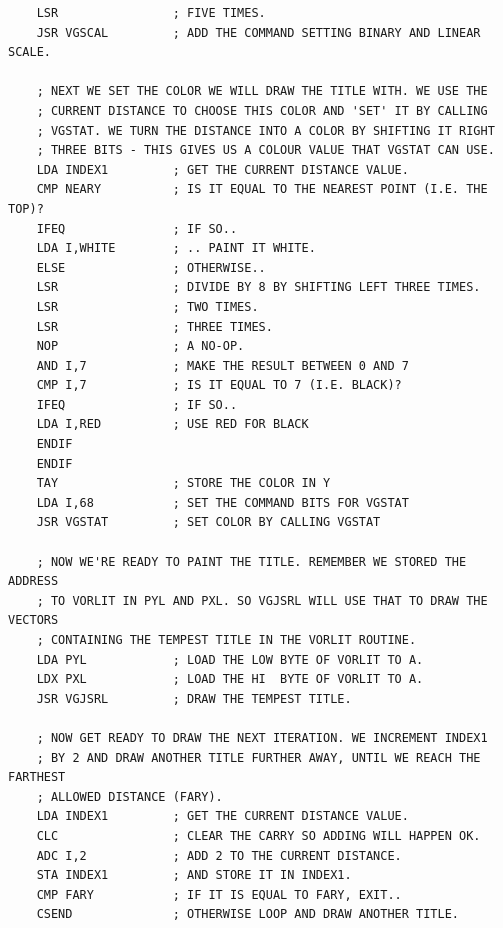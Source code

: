 \begin{lstlisting}
    LSR                ; FIVE TIMES.
    JSR VGSCAL         ; ADD THE COMMAND SETTING BINARY AND LINEAR SCALE.
    
    ; NEXT WE SET THE COLOR WE WILL DRAW THE TITLE WITH. WE USE THE
    ; CURRENT DISTANCE TO CHOOSE THIS COLOR AND 'SET' IT BY CALLING
    ; VGSTAT. WE TURN THE DISTANCE INTO A COLOR BY SHIFTING IT RIGHT
    ; THREE BITS - THIS GIVES US A COLOUR VALUE THAT VGSTAT CAN USE.
    LDA INDEX1         ; GET THE CURRENT DISTANCE VALUE.
    CMP NEARY          ; IS IT EQUAL TO THE NEAREST POINT (I.E. THE TOP)?
    IFEQ               ; IF SO..
    LDA I,WHITE        ; .. PAINT IT WHITE.
    ELSE               ; OTHERWISE..
    LSR                ; DIVIDE BY 8 BY SHIFTING LEFT THREE TIMES.
    LSR                ; TWO TIMES.
    LSR                ; THREE TIMES.
    NOP                ; A NO-OP.
    AND I,7            ; MAKE THE RESULT BETWEEN 0 AND 7
    CMP I,7            ; IS IT EQUAL TO 7 (I.E. BLACK)?
    IFEQ               ; IF SO..
    LDA I,RED          ; USE RED FOR BLACK
    ENDIF
    ENDIF
    TAY                ; STORE THE COLOR IN Y
    LDA I,68           ; SET THE COMMAND BITS FOR VGSTAT
    JSR VGSTAT         ; SET COLOR BY CALLING VGSTAT
    
    ; NOW WE'RE READY TO PAINT THE TITLE. REMEMBER WE STORED THE ADDRESS
    ; TO VORLIT IN PYL AND PXL. SO VGJSRL WILL USE THAT TO DRAW THE VECTORS
    ; CONTAINING THE TEMPEST TITLE IN THE VORLIT ROUTINE.
    LDA PYL            ; LOAD THE LOW BYTE OF VORLIT TO A.
    LDX PXL            ; LOAD THE HI  BYTE OF VORLIT TO A.
    JSR VGJSRL         ; DRAW THE TEMPEST TITLE.
    
    ; NOW GET READY TO DRAW THE NEXT ITERATION. WE INCREMENT INDEX1
    ; BY 2 AND DRAW ANOTHER TITLE FURTHER AWAY, UNTIL WE REACH THE FARTHEST
    ; ALLOWED DISTANCE (FARY).
    LDA INDEX1         ; GET THE CURRENT DISTANCE VALUE.
    CLC                ; CLEAR THE CARRY SO ADDING WILL HAPPEN OK.
    ADC I,2            ; ADD 2 TO THE CURRENT DISTANCE.
    STA INDEX1         ; AND STORE IT IN INDEX1.
    CMP FARY           ; IF IT IS EQUAL TO FARY, EXIT..
    CSEND              ; OTHERWISE LOOP AND DRAW ANOTHER TITLE.
\end{lstlisting}

